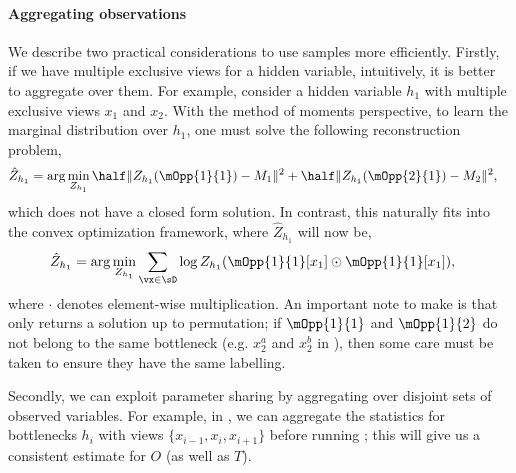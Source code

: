\paragraph{Aggregating observations}
We describe two practical considerations to use samples more efficiently.
Firstly, if we have multiple exclusive views for a hidden variable,
  intuitively, it is better to aggregate over them. 
For example, consider a hidden variable $h_1$ with multiple exclusive
  views $x_1$ and $x_2$.
With the method of moments perspective, to learn the marginal
  distribution over $h_1$, one must solve the following reconstruction
  problem, 
\begin{align*}
  \hat Z_{h_1} &= \arg\min_{Z_{h_1}} \half \|Z_{h_1}(\mOpp{1}{1}) - M_1 \|^2 + \half \|Z_{h_1}(\mOpp{2}{1}) - M_2 \|^2,
\end{align*}
which does not have a closed form solution. 
In contrast, this naturally fits into the convex optimization framework, where $\hat Z_{h_1}$ will now be,
\begin{align*}
  \hat Z_{h_1} &= \arg\min_{Z_{h_1}} \sum_{\vx \in \sD} \log Z_{h_1}( \mOpp{1}{1}[x_1] \odot \mOpp{1}{1}[x_1] ),
\end{align*}
where $\cdot$ denotes element-wise multiplication.
An important note to make is that \TensorFactorize only returns
  a solution up to permutation; if $\mOpp{1}{1}$ and
  $\mOpp{1}{2}$ do not belong to the same bottleneck (e.g. $x^a_2$ and
  $x^b_2$ in ), then some
  care must be taken to ensure they have the same labelling.

Secondly, we can exploit parameter sharing by aggregating over
  disjoint sets of observed variables. 
For example, in , we can aggregate the statistics for
  bottlenecks $h_i$ with views $\{x_{i-1}, x_{i}, x_{i+1}\}$ before
  running \TensorFactorize; this will give us a consistent estimate for
  $O$ (as well as $T$).

